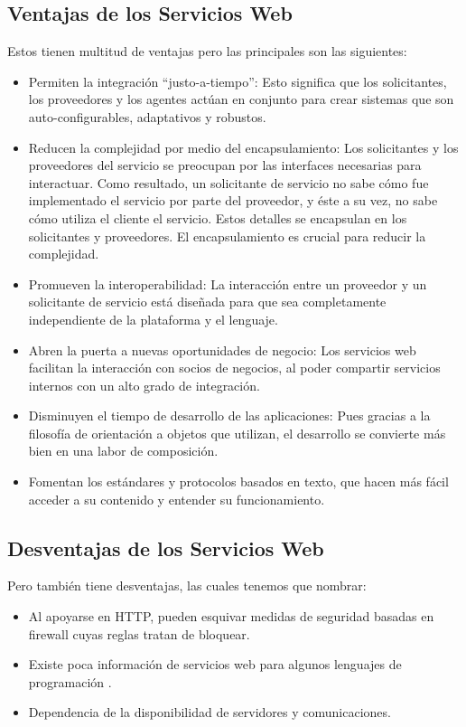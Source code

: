 \subsection{Ventajas de los  Servicios Web}
\label{cap:subsec:ventajasserviciosweb}
Estos tienen multitud de ventajas pero las principales son las siguientes:
\begin{itemize}
	 \item Permiten la integración “justo-a-tiempo”:  Esto significa que los solicitantes, los proveedores y los agentes actúan en conjunto para crear sistemas que son auto-configurables, adaptativos y robustos.
	\item Reducen la complejidad por medio del encapsulamiento: Los solicitantes y los proveedores del servicio se preocupan por las interfaces necesarias para interactuar. Como resultado, un solicitante de servicio no sabe cómo fue implementado el servicio por parte del proveedor, y éste a su vez, no sabe cómo utiliza el cliente el servicio. Estos detalles se encapsulan en los solicitantes y proveedores. El encapsulamiento es crucial para reducir la complejidad.
	\item Promueven la interoperabilidad: La interacción entre un proveedor y un solicitante de servicio está diseñada para que sea completamente independiente de la plataforma y el lenguaje. 
	\item Abren la puerta a nuevas oportunidades de negocio: Los servicios web facilitan la interacción con socios de negocios, al poder compartir servicios internos con un alto grado de integración.
	\item Disminuyen el tiempo de desarrollo de las aplicaciones: Pues gracias a la filosofía de orientación a objetos que utilizan, el desarrollo se convierte más bien en una labor de composición.
	\item Fomentan los estándares y protocolos basados en texto, que hacen más fácil acceder a su contenido y entender su funcionamiento.
\end{itemize}

\subsection{Desventajas de los  Servicios Web}
\label{cap:subsec:desventajasserviciosweb}
Pero también tiene desventajas, las cuales tenemos que nombrar:
\begin{itemize}
	\item Al apoyarse en HTTP, pueden esquivar medidas de seguridad basadas en firewall cuyas reglas tratan de bloquear.
	\item Existe poca información de servicios web para algunos lenguajes de programación .
	\item Dependencia de la disponibilidad de servidores y comunicaciones.
\end{itemize}




